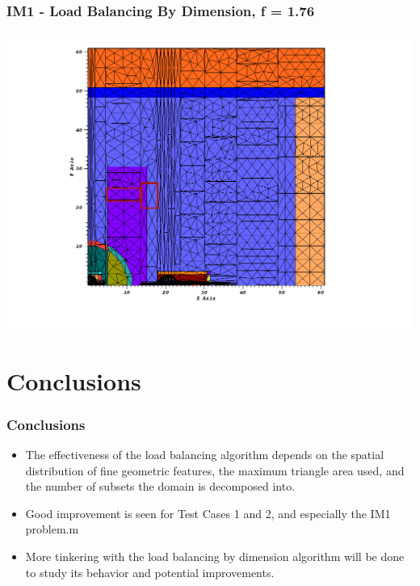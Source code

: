 \documentclass[compress]{beamer}
\begin{document}
\begin{frame}[t]\frametitle{IM1 - Load Balancing By Dimension, f = 1.76}
\centering
\includegraphics[scale=0.33]{figures/IM1_new_load_balance.png}
\end{frame}

\section{Conclusions}
\begin{frame}[t]\frametitle{Conclusions}
\begin{block}{}
\begin{itemize}
\item The effectiveness of the load balancing algorithm depends on the spatial distribution of fine geometric features, the maximum triangle area used, and the number of subsets the domain is decomposed into.
\item Good improvement is seen for Test Cases 1 and 2, and especially the IM1 problem.m
\item More tinkering with the load balancing by dimension algorithm will be done to study its behavior and potential improvements.
\end{itemize}
\end{block}
\end{frame}
\end{document}
